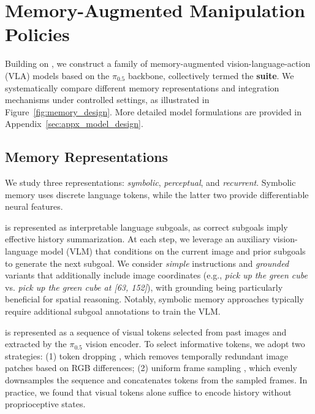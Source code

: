 \section{Memory-Augmented Manipulation Policies}
\vspace{4pt}
Building on \benchname, we construct a family of memory-augmented vision-language-action (VLA) models based on the $\pi_{0.5}$ backbone, collectively termed the \textbf{\modelname\xspace suite}. 
We systematically compare different memory representations and integration mechanisms under controlled settings, as illustrated in Figure~\ref{fig:memory_design}.
More detailed model formulations are provided in Appendix~\ref{sec:appx_model_design}.
\subsection{Memory Representations}

We study three representations: \textit{symbolic}, \textit{perceptual}, and \textit{recurrent}. 
Symbolic memory uses discrete language tokens, while the latter two provide differentiable neural features.

 is represented as interpretable language subgoals, as correct subgoals imply effective history summarization. At each step, we leverage an auxiliary vision-language model (VLM) that conditions on the current image and prior subgoals to generate the next subgoal. We consider \emph{simple} instructions and \emph{grounded} variants that additionally include image coordinates (e.g., \textit{pick up the green cube} vs. \textit{pick up the green cube at [63, 152]}), with grounding being particularly beneficial for spatial reasoning. Notably, symbolic memory approaches typically require additional subgoal annotations to train the VLM.

 is represented as a sequence of visual tokens selected from past images and  extracted by the $\pi_{0.5}$ vision encoder. To select informative tokens, we adopt two strategies: (1) token dropping \cite{yao2025timechat}, which removes temporally redundant image patches based on RGB differences; (2) uniform frame sampling \cite{chen2024videollm}, which evenly downsamples the sequence and concatenates tokens from the sampled frames. In practice, we found that visual tokens alone suffice to encode history without proprioceptive states.

